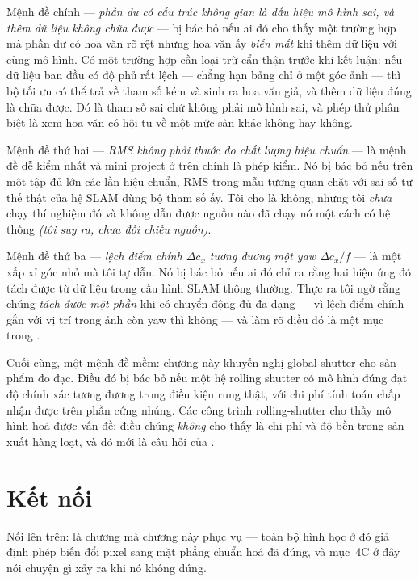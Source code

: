 \documentclass[../../vslam.tex]{subfiles}
\begin{document}
Mệnh đề chính --- \emph{phần dư có cấu trúc không gian là dấu hiệu mô hình sai, và thêm dữ liệu không chữa được} --- bị bác bỏ nếu ai đó cho thấy một trường hợp mà phần dư có hoa văn rõ rệt nhưng hoa văn ấy \emph{biến mất} khi thêm dữ liệu với cùng mô hình. Có một trường hợp cần loại trừ cẩn thận trước khi kết luận: nếu dữ liệu ban đầu có độ phủ rất lệch --- chẳng hạn bảng chỉ ở một góc ảnh --- thì bộ tối ưu có thể trả về tham số kém và sinh ra hoa văn giả, và thêm dữ liệu đúng là chữa được. Đó là tham số sai chứ không phải mô hình sai, và phép thử phân biệt là xem hoa văn có hội tụ về một mức sàn khác không hay không.

Mệnh đề thứ hai --- \emph{RMS không phải thước đo chất lượng hiệu chuẩn} --- là mệnh đề dễ kiểm nhất và mini project ở trên chính là phép kiểm. Nó bị bác bỏ nếu trên một tập đủ lớn các lần hiệu chuẩn, RMS trong mẫu tương quan chặt với sai số tư thế thật của hệ SLAM dùng bộ tham số ấy. Tôi cho là không, nhưng tôi \emph{chưa} chạy thí nghiệm đó và không dẫn được nguồn nào đã chạy nó một cách có hệ thống \emph{(tôi suy ra, chưa đối chiếu nguồn)}.

Mệnh đề thứ ba --- \emph{lệch điểm chính \(\Delta c_x\) tương đương một yaw \(\Delta c_x/f\)} --- là một xấp xỉ góc nhỏ mà tôi tự dẫn. Nó bị bác bỏ nếu ai đó chỉ ra rằng hai hiệu ứng đó tách được từ dữ liệu trong cấu hình SLAM thông thường. Thực ra tôi ngờ rằng chúng \emph{tách được một phần} khi có chuyển động đủ đa dạng --- vì lệch điểm chính gắn với vị trí trong ảnh còn yaw thì không --- và làm rõ điều đó là một mục trong .

Cuối cùng, một mệnh đề mềm: chương này khuyến nghị global shutter cho sản phẩm đo đạc. Điều đó bị bác bỏ nếu một hệ rolling shutter có mô hình đúng đạt độ chính xác tương đương trong điều kiện rung thật, với chi phí tính toán chấp nhận được trên phần cứng nhúng. Các công trình rolling-shutter \cite{schubert2018rollingshutter} cho thấy mô hình hoá được vấn đề; điều chúng \emph{không} cho thấy là chi phí và độ bền trong sản xuất hàng loạt, và đó mới là câu hỏi của .

\section{Kết nối}

Nối lên trên:  là chương mà chương này phục vụ --- toàn bộ hình học ở đó giả định phép biến đổi pixel sang mặt phẳng chuẩn hoá đã đúng, và mục~4C ở đây nói chuyện gì xảy ra khi nó không đúng.
\end{document}
